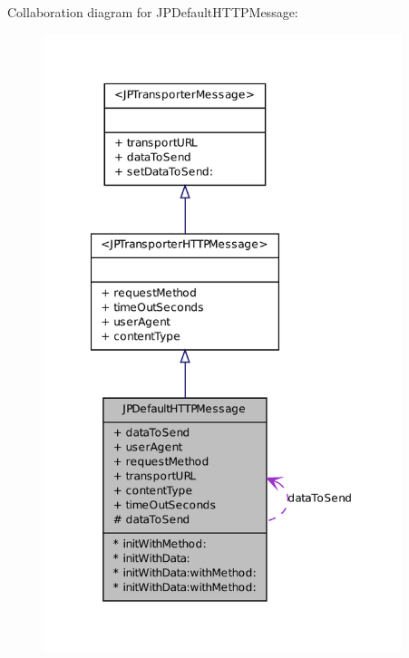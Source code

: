 Collaboration diagram for JPDefaultHTTPMessage:
\nopagebreak
\begin{figure}[H]
\begin{center}
\leavevmode
\includegraphics[width=296pt]{a00098}
\end{center}
\end{figure}
